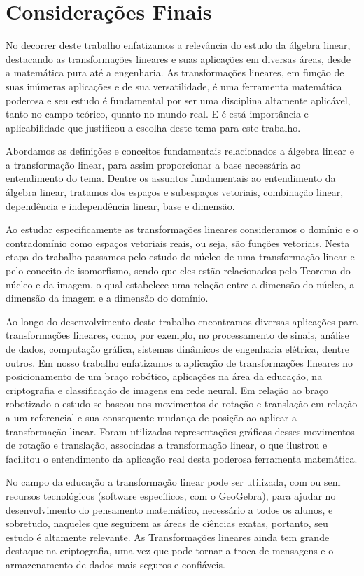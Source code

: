 \chapter{Considerações Finais}
No decorrer deste trabalho enfatizamos a relevância do estudo da álgebra linear, destacando as transformações lineares e suas aplicações em diversas áreas, desde a matemática pura até a engenharia. As transformações lineares, em função de suas inúmeras aplicações e de sua versatilidade, é uma ferramenta matemática poderosa e seu estudo é fundamental por ser uma disciplina altamente aplicável, tanto no campo teórico, quanto no mundo real. E é está importância e aplicabilidade que justificou a escolha deste tema para este trabalho.

Abordamos as definições e conceitos fundamentais relacionados a álgebra linear e a transformação linear, para assim proporcionar a base necessária ao entendimento do tema. Dentre os assuntos fundamentais ao entendimento da álgebra linear, tratamos dos espaços e subespaços vetoriais, combinação linear, dependência e independência linear, base e dimensão.

Ao estudar especificamente as transformações lineares consideramos o domínio e o contradomínio como espaços vetoriais reais, ou seja, são funções vetoriais. Nesta etapa do trabalho passamos pelo estudo do núcleo de uma transformação linear e pelo conceito de isomorfismo, sendo que eles estão relacionados pelo Teorema do núcleo e da imagem, o qual estabelece uma relação entre a dimensão do núcleo, a dimensão da imagem e a dimensão do domínio.

Ao longo do desenvolvimento deste trabalho encontramos diversas aplicações para transformações lineares, como, por exemplo, no processamento de sinais, análise de dados, computação gráfica, sistemas dinâmicos de engenharia elétrica, dentre outros. Em nosso trabalho enfatizamos a aplicação de transformações lineares no posicionamento de um braço robótico, aplicações na área da educação, na criptografia e classificação de imagens em rede neural. Em relação ao braço robotizado o estudo se baseou nos movimentos de rotação e translação em relação a um referencial e sua consequente mudança de posição ao aplicar a transformação linear. Foram utilizadas representações gráficas desses movimentos de rotação e translação, associadas a transformação linear, o que ilustrou e facilitou o entendimento da aplicação real desta poderosa  ferramenta matemática.

No campo da educação a transformação linear pode ser utilizada, com ou sem recursos tecnológicos (software específicos, com o GeoGebra), para ajudar no desenvolvimento do pensamento matemático, necessário a todos os alunos, e sobretudo, naqueles que seguirem as áreas de ciências exatas, portanto, seu estudo é altamente relevante. As Transformações lineares ainda tem grande destaque na criptografia, uma vez que pode tornar a troca de mensagens e o armazenamento de dados mais seguros e confiáveis.

